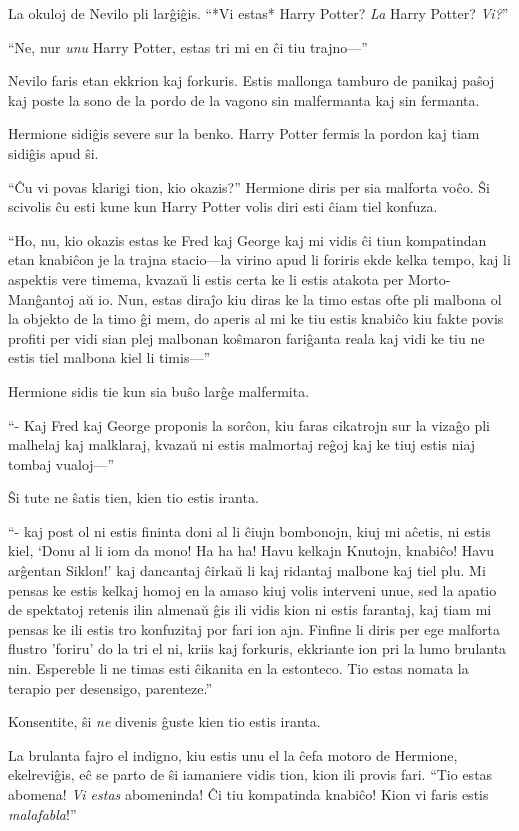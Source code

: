 La okuloj de Nevilo pli larĝiĝis. ``*Vi estas* Harry Potter? \emph{La}
Harry Potter? \emph{Vi?}''

``Ne, nur \emph{unu} Harry Potter, estas tri mi en ĉi tiu trajno—''

Nevilo faris etan ekkrion kaj forkuris. Estis mallonga tamburo de
panikaj paŝoj kaj poste la sono de la pordo de la vagono sin
malfermanta kaj sin fermanta.

Hermione sidiĝis severe sur la benko. Harry Potter fermis la pordon
kaj tiam sidiĝis apud ŝi.

``Ĉu vi povas klarigi tion, kio okazis?'' Hermione diris per sia
malforta voĉo. Ŝi scivolis ĉu esti kune kun Harry Potter volis diri
esti ĉiam tiel konfuza.

``Ho, nu, kio okazis estas ke Fred kaj George kaj mi vidis ĉi tiun
kompatindan etan knabiĉon je la trajna stacio—la virino apud li
foriris ekde kelka tempo, kaj li aspektis vere timema, kvazaŭ li estis
certa ke li estis atakota per Morto-Manĝantoj aŭ io.  Nun, estas
diraĵo kiu diras ke la timo estas ofte pli malbona ol la objekto de la
timo ĝi mem, do aperis al mi ke tiu estis knabiĉo kiu fakte povis
profiti per vidi sian plej malbonan koŝmaron fariĝanta reala kaj vidi
ke tiu ne estis tiel malbona kiel li timis—''

Hermione sidis tie kun sia buŝo larĝe malfermita.

``- Kaj Fred kaj George proponis la sorĉon, kiu faras cikatrojn sur la
vizaĝo pli malhelaj kaj malklaraj, kvazaŭ ni estis malmortaj reĝoj kaj
ke tiuj estis niaj tombaj vualoj—''

Ŝi tute ne ŝatis tien, kien tio estis iranta.

``- kaj post ol ni estis fininta doni al li ĉiujn bombonojn, kiuj mi
aĉetis, ni estis kiel, `Donu al li iom da mono! Ha ha ha! Havu kelkajn
Knutojn, knabiĉo!  Havu arĝentan Siklon!' kaj dancantaj ĉirkaŭ li kaj
ridantaj malbone kaj tiel plu. Mi pensas ke estis kelkaj homoj en la
amaso kiuj volis interveni unue, sed la apatio de spektatoj retenis
ilin almenaŭ ĝis ili vidis kion ni estis farantaj, kaj tiam mi pensas
ke ili estis tro konfuzitaj por fari ion ajn. Finfine li diris per ege
malforta flustro 'foriru' do la tri el ni, kriis kaj forkuris,
ekkriante ion pri la lumo brulanta nin. Espereble li ne timas esti
ĉikanita en la estonteco. Tio estas nomata la terapio per desensigo,
parenteze.''

Konsentite, ŝi \emph{ne} divenis ĝuste kien tio estis iranta.

La brulanta fajro el indigno, kiu estis unu el la ĉefa motoro de
Hermione, ekelreviĝis, eĉ se parto de ŝi iamaniere vidis tion, kion
ili provis fari. ``Tio estas abomena! \emph{Vi estas} abomeninda! Ĉi
tiu kompatinda knabiĉo! Kion vi faris estis \emph{malafabla}!''

